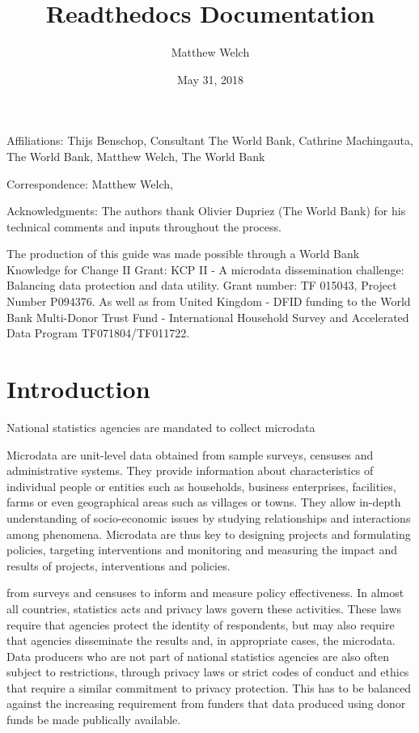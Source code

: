 \documentclass[letterpaper,10pt,english]{sphinxmanual}
\title{Readthedocs Documentation}
\date{May 31, 2018}
\author{Matthew Welch}
\begin{document}
\maketitle
\sphinxtableofcontents
{}\label{\detokenize{index::doc}}





Affiliations: Thijs Benschop, Consultant The World Bank, Cathrine
Machingauta, The World Bank, Matthew Welch, The World Bank

Correspondence: Matthew Welch, 

Acknowledgments: The authors thank Olivier Dupriez (The World Bank) for
his technical comments and inputs throughout the process.

The production of this guide was made possible through a World Bank
Knowledge for Change II Grant: KCP II - A microdata dissemination
challenge: Balancing data protection and data utility. Grant number: TF
015043, Project Number P094376. As well as from United Kingdom - DFID
funding to the World Bank Multi-Donor Trust Fund - International
Household Survey and Accelerated Data Program \textendash{} TF071804/TF011722.


\chapter{Introduction}
\label{\detokenize{intro:statistical-disclosure-control-for-microdata-a-practice-guide}}\label{\detokenize{intro::doc}}\label{\detokenize{intro:introduction}}
National statistics agencies are mandated to collect
microdata %
\begin{footnote}[1]\sphinxAtStartFootnote
Microdata are unit-level data obtained from sample surveys, censuses
and administrative systems. They provide information about
characteristics of individual people or entities such as households,
business enterprises, facilities, farms or even geographical areas
such as villages or towns. They allow in-depth understanding of
socio-economic issues by studying relationships and interactions
among phenomena. Microdata are thus key to designing projects and
formulating policies, targeting interventions and monitoring and
measuring the impact and results of projects, interventions and
policies.
%
\end{footnote} from surveys and censuses to inform and
measure policy effectiveness. In almost all countries, statistics acts
and privacy laws govern these activities. These laws require that
agencies protect the identity of respondents, but may also require that
agencies disseminate the results and, in appropriate cases, the
microdata. Data producers who are not part of national statistics
agencies are also often subject to restrictions, through privacy laws or
strict codes of conduct and ethics that require a similar commitment to
privacy protection. This has to be balanced against the increasing
requirement from funders that data produced using donor funds be made
publically available.
\end{document}
